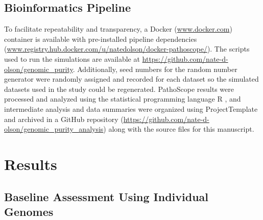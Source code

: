 \documentclass[fleqn,10pt,lineno]{wlpeerj}\usepackage[]{graphicx}\usepackage[]{color}
\begin{document}
\subsection*{Bioinformatics Pipeline}


To facilitate repeatability and transparency, a Docker (\url{www.docker.com}) container is available
with pre-installed pipeline dependencies (\url{www.registry.hub.docker.com/u/natedolson/docker-pathoscope/}).
The scripts used to run the simulations are available at \url{https://github.com/nate-d-olson/genomic_purity}.
Additionally, seed numbers for the random number generator were randomly assigned and recorded for each dataset so the simulated datasets used in the study could be regenerated.
PathoScope results were processed and analyzed using the statistical programming language R \citep{R}, and intermediate analysis and data summaries were organized using ProjectTemplate \citep{ProjectTemplate} and archived in a GitHub repository (\url{https://github.com/nate-d-olson/genomic_purity_analysis}) along with the source files for this manuscript. 


\section*{Results}

\subsection*{Baseline Assessment Using Individual Genomes}
\end{document}
